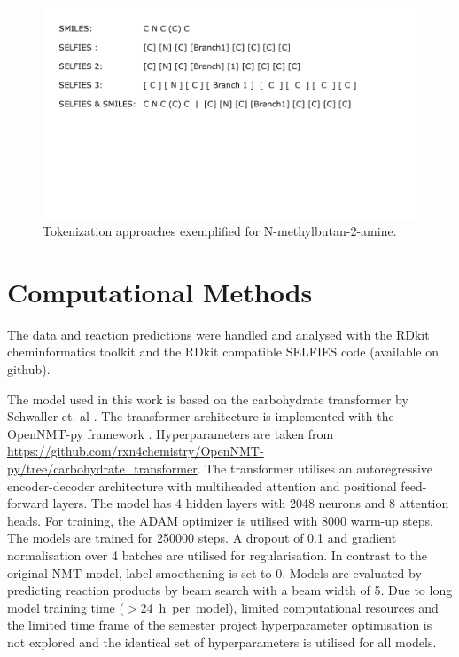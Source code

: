 \documentclass[10pt,conference,compsocconf]{IEEEtran}
\begin{document}
\begin{figure}[h]
    \centering
    \includegraphics[width = 1\linewidth, trim={1.25cm 9.75cm 3.5cm 1.25cm},clip]{./figures/representation.pdf}
    \caption{Tokenization approaches exemplified for N-methylbutan-2-amine.}
    \label{fig:tokenization_approaches}
\end{figure} 

\section{Computational Methods}

The data and reaction predictions were handled and analysed with the RDkit \cite{noauthor_rdkit_nodate} cheminformatics toolkit and the RDkit compatible SELFIES code (available on github).\cite{noauthor_selfies_2021}

The model used in this work is based on the carbohydrate transformer by Schwaller et. al \cite{Pesciullesi.2020}. The transformer architecture is implemented with the OpenNMT-py framework \cite{klein-etal-2017-opennmt}. Hyperparameters are taken from \url{https://github.com/rxn4chemistry/OpenNMT-py/tree/carbohydrate_transformer}. The transformer utilises an autoregressive encoder-decoder architecture with multiheaded attention and positional feed-forward layers. The model has 4 hidden layers with 2048 neurons and 8 attention heads. For training, the ADAM optimizer is utilised with 8000 warm-up steps. The models are trained for 250000 steps. A dropout of 0.1 and gradient normalisation over 4 batches are utilised for regularisation. In contrast to the original NMT model, label smoothening is set to 0. Models are evaluated by predicting reaction products by beam search with a beam width of 5. Due to long model training time ($>$24~h~per~model), limited computational resources and the limited time frame of the semester project hyperparameter optimisation is not explored and the identical set of hyperparameters is utilised for all models.
\end{document}
